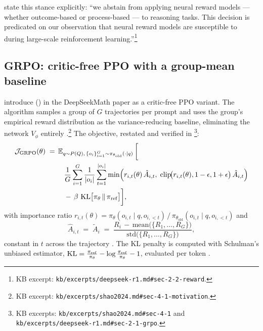 \citet[\S 2.2]{deepseek-r1} state this stance explicitly: ``we abstain
from applying neural reward models — whether outcome-based or
process-based — to reasoning tasks. This decision is predicated on our
observation that neural reward models are susceptible to 
during large-scale reinforcement learning.''\footnote{KB excerpt:
\texttt{kb/excerpts/deepseek-r1.md\#sec-2-2-reward}.}

\subsection{GRPO: critic-free PPO with a group-mean baseline}
\label{sec:rlvr-grpo-objective}

\citet{shao2024} introduce \emph{}
() in the DeepSeekMath paper as a critic-free PPO variant. The
algorithm samples a group of $G$ trajectories per prompt and uses the
group's empirical reward distribution as the variance-reducing
baseline, eliminating the  network $V_\phi$ entirely
\citep[\S 4.1, motivation]{shao2024}.\footnote{KB excerpt:
\texttt{kb/excerpts/shao2024.md\#sec-4-1-motivation}.} The objective,
restated and verified in \citet[\S 2.1, Eq.\ 1]{deepseek-r1}\footnote{KB
excerpts: \texttt{kb/excerpts/shao2024.md\#sec-4-1} and
\texttt{kb/excerpts/deepseek-r1.md\#sec-2-1-grpo}.}:
\begin{equation}
\begin{aligned}
\mathcal{J}_{\mathrm{GRPO}}(\theta) \;=\; & \operatorname{\mathbb{E}}_{q \sim P(Q),\, \{o_i\}_{i=1}^G \sim \pi_{\theta_{\mathrm{old}}}(\cdot \mid q)} \bigg[ \\
& \quad \frac{1}{G} \sum_{i=1}^{G} \frac{1}{|o_i|} \sum_{t=1}^{|o_i|}
\min\!\Big( r_{i,t}(\theta)\, \hat{A}_{i,t},\;
\mathrm{clip}\!\big(r_{i,t}(\theta), 1 - \epsilon, 1 + \epsilon\big)\, \hat{A}_{i,t} \Big) \\
& \quad -\, \beta \, \operatorname{KL}\!\big[\pi_\theta \,\|\, \pi_{\mathrm{ref}}\big] \bigg],
\end{aligned}
\label{eq:grpo}
\end{equation}
with importance ratio
$r_{i,t}(\theta) = \pi_\theta(o_{i,t} \mid q, o_{i,<t}) \,/\, \pi_{\theta_{\mathrm{old}}}(o_{i,t} \mid q, o_{i,<t})$
and \emph{}
\begin{equation}
\hat{A}_{i,t} \;=\; \tilde{A}_i \;=\; \frac{R_i \,-\, \mathrm{mean}\!\big(\{R_1, \ldots, R_G\}\big)}{\mathrm{std}\!\big(\{R_1, \ldots, R_G\}\big)},
\label{eq:grpo-advantage}
\end{equation}
constant in $t$ across the trajectory \citep[\S 4.1, Eq.\ verified
against R1 \S 2.1 Eq.\ 3]{shao2024}. The KL penalty is computed with
Schulman's unbiased estimator,
$\operatorname{KL} = \tfrac{\pi_{\mathrm{ref}}}{\pi_\theta} - \log\tfrac{\pi_{\mathrm{ref}}}{\pi_\theta} - 1$,
evaluated per token \citep[\S 4.1]{shao2024}.

